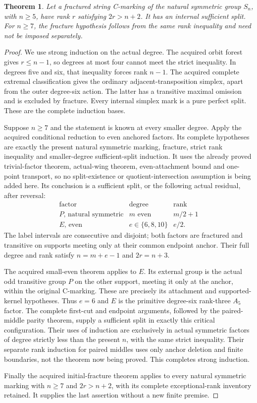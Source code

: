 \documentclass[11pt,a4paper]{article}
\newtheorem{theorem}{Theorem}
\begin{document}
\begin{theorem}\label{sufficient}
Let a fractured string C-marking of the natural symmetric group
$S_n$, with $n\ge5$, have rank $r$ satisfying $2r>n+2$.
It has an internal sufficient split.
For $n\ge7$, the fracture hypothesis follows from the same rank
inequality and need not be imposed separately.
\end{theorem}
\begin{proof}
We use strong induction on the actual degree. The acquired orbit
forest gives $r\le n-1$, so degrees at most four cannot meet the
strict inequality. In degrees five and six, that inequality forces
rank $n-1$. The acquired complete extremal classification gives
the ordinary adjacent-transposition simplex, apart from the outer
degree-six action. The latter has a transitive maximal omission
and is excluded by fracture. Every internal simplex mark is a pure
perfect split. These are the complete induction bases.

Suppose $n\ge7$ and the statement is known at every smaller degree.
Apply the acquired conditional reduction to even anchored factors.
Its complete hypotheses are exactly the present natural symmetric
marking, fracture, strict rank inequality and smaller-degree
sufficient-split induction. It uses the already proved trivial-factor
theorem, actual-wing theorem, even-attachment bound and one-point
transport, so no split-existence or quotient-intersection assumption
is being added here. Its conclusion is a sufficient split, or the
following actual residual, after reversal:
\[
 \begin{array}{c|c|c}
 \text{factor}&\text{degree}&\text{rank}\\\hline
 P\text{, natural symmetric}&m\text{ even}&m/2+1\\
 E\text{, even}&e\in\{6,8,10\}&e/2.
 \end{array}
\]
The label intervals are consecutive and disjoint; both factors are
fractured and transitive on supports meeting only at their common
endpoint anchor. Their full degree and rank satisfy $n=m+e-1$
and $2r=n+3$.

The acquired small-even theorem applies to $E$. Its external group
is the actual odd transitive group $P$ on the other support, meeting
it only at the anchor, within the original C-marking. These are
precisely its attachment and supported-kernel hypotheses. Thus
$e=6$ and $E$ is the primitive degree-six rank-three $A_5$ factor.
The complete first-cut and endpoint arguments, followed by the
paired-middle parity theorem, supply a sufficient split in exactly
this critical configuration. Their uses of induction are exclusively
in actual symmetric factors of degree strictly less than the present
$n$, with the same strict inequality. Their separate rank induction
for paired middles uses only anchor deletion and finite boundaries,
not the theorem now being proved. This completes strong induction.

Finally the acquired initial-fracture theorem applies to every
natural symmetric marking with $n\ge7$ and $2r>n+2$, with its
complete exceptional-rank inventory retained. It supplies the last
assertion without a new finite premise.
\end{proof}
\end{document}

